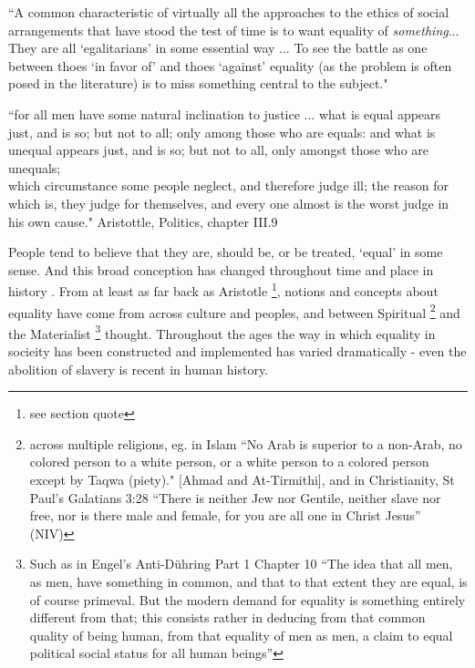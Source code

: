 \documentclass{article}
\begin{document}
\begin{displayquote}
``A common characteristic of virtually all the approaches to the ethics of social arrangements that have stood the test of time is to want equality of \textit{something}... They are all `egalitarians' in some essential way ... To see the battle as one between thoes `in favor of' and thoes `against' equality (as the problem is often posed in the literature) is to miss something central to the subject."\cite{18084} 
\end{displayquote}

\begin{displayquote}
``for all men have some natural inclination to justice ... what is equal appears just, and is so; but not to all; only among those who are equals: and what is unequal appears just, and is so; but not to all, only amongst those who are unequals;\\
which circumstance some people neglect, and therefore judge ill; the reason for which is, they judge for themselves, and every one almost is the worst judge in his own cause." Aristottle, Politics, chapter III.9\cite{AristotleGutenberg}
\end{displayquote}

People tend to believe that they are, should be, or be treated, `equal' in some sense.
And this broad conception has changed throughout time and place in history \cite{themeaningofequalitycapaldi}.
From at least as far back as Aristotle \cite{AristotleGutenberg}\footnote{see section quote}, notions and concepts about equality have come from across culture and peoples, and between Spiritual \footnote{across multiple religions, eg. in Islam ``No Arab is superior to a non-Arab, no colored person to a  white person, or a white person to a colored person except by Taqwa (piety)." [Ahmad and At-Tirmithi], and in Christianity, St Paul's Galatians 3:28 ``There is neither Jew nor Gentile, neither slave nor free, nor is there male and female, for you are all one in Christ Jesus'' (NIV) } and the Materialist \footnote{Such as in Engel's Anti-D\"{u}hring Part 1 Chapter 10 ``The idea that all men, as men, have something in common, and that to that extent they are equal, is of course primeval. But the modern demand for equality is something entirely different from that; this consists rather in deducing from that common quality of being human, from that equality of men as men, a claim to equal political social status for all human beings''} thought.
Throughout the ages the way in which equality in socieity has been constructed and implemented has varied dramatically - even the abolition of slavery is recent in human history.
\end{document}
